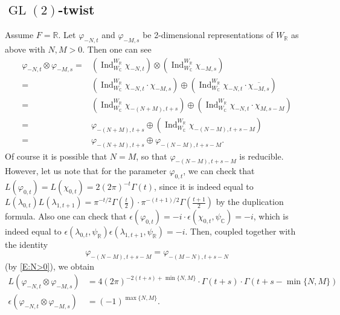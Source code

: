 \documentclass[11pt]{amsart}
\theoremstyle{plain}
\theoremstyle{definition}
\numberwithin{equation}{section}
\newcommand{\C}{\mathbb C}
\newcommand{\R}{\mathbb{R}}
\newcommand{\la}{\lambda}
\newcommand{\Ind}{\operatorname{Ind}}
\newcommand{\GL}{\operatorname{GL}}
\begin{document}
\subsection{$\GL(2)$-twist}
Assume $F=\R$. Let $\varphi_{-N,t}$ and $\varphi_{-M,s}$ be
2-dimensional representations of $W_\R$ as above with $N, M >  0$. Then one can see
\begin{align*}
\varphi_{-N,t}\otimes\varphi_{-M,s}=&
\left(\Ind_{W_\C}^{W_\R}\chi_{-N,t}\right)\otimes
\left(\Ind_{W_\C}^{W_\R}\chi_{-M,s}\right)\\
=&\left(\Ind_{W_\C}^{W_\R}\chi_{-N,t}\cdot\chi_{-M,s}\right)\oplus
\left(\Ind_{W_\C}^{W_\R}\chi_{-N,t}\cdot\overline{\chi_{-M,s}}\right)\\
=&\left(\Ind_{W_\C}^{W_\R}\chi_{-(N+M),t+s}\right)\oplus
\left(\Ind_{W_\C}^{W_\R}\chi_{-N,t}\cdot\chi_{M,s-M}\right)\\
=&\varphi_{-(N+M), t+s}\oplus
\left(\Ind_{W_\C}^{W_\R}\chi_{-(N-M),t+s-M}\right)\\
=&\varphi_{-(N+M), t+s}\oplus\varphi_{-(N-M), t+s-M}.
\end{align*}
Of course it is possible that $N=M$, so that $\varphi_{-(N-M), t+s-M}$ is reducible.  However, let us note that for the parameter $\varphi_{0, t}$, we can check that $L(\varphi_{0,
  t})=L(\chi_{0, t})=2(2\pi)^{-t}\Gamma(t)$, since it is indeed equal to
$L(\la_{0,t})L(\la_{1,t+1})=\pi^{-t/2}\Gamma(\frac{t}{2})\cdot\pi^{-(t+1)/2}\Gamma(\frac{t+1}{2})$
by the duplication formula. Also
one can check that
$\epsilon(\varphi_{0,t})=-i\cdot\epsilon(\chi_{0,t},\psi_\C)=-i$,
which is indeed equal to $\epsilon(\la_{0,t},\psi_\R)\epsilon(\la_{1,t+1},\psi_\R)=-i$.  Then, coupled together with the identity 
\[
\varphi_{-(N-M), t+s-M}=\varphi_{-(M-N), t+s-N}
\]
(by \eqref{E:N>0}), we obtain
\begin{align}
\label{E:GL(2)xGL(2)_L}
  L(\varphi_{-N,t}\otimes\varphi_{-M,s})&=4(2\pi)^{-2(t+s)+\min\{N, M\}}\cdot\Gamma(t+s)\cdot
\Gamma(t+s-\min\{N, M\})\\
\label{E:GL(2)xGL(2)_ep}\epsilon(\varphi_{-N,t}\otimes\varphi_{-M,s})&=(-1)^{\max\{N, M\}}.
\end{align}
\end{document}
